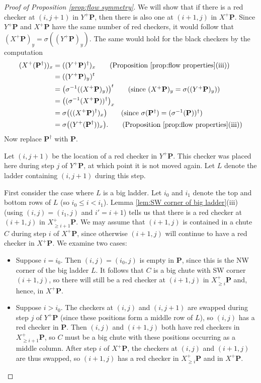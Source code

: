 \documentclass[11pt,reqno]{amsart} %
\newcommand{\bfP}{\mathbf{P}}
\theoremstyle{definition}
\begin{document}
\begin{proof}[Proof of Proposition \ref{prop:flow symmetry}]
We will show that if there is a red checker at $(i,j+1)$ in $Y^+\bfP$, then there is also one at $(i+1,j)$ in $X^+\bfP$.
Since $Y^+\bfP$ and $X^+\bfP$ have the same number of red checkers, it would follow that $(X^+\bfP)_y = \sigma((Y^+\bfP)_y)$.
The same would hold for the black checkers by the computation
\begin{align*}
    (X^+(\bfP^\dagger))_x
    &= ((Y^+\bfP)^\dagger)_x
    \tag{Proposition \ref{prop:flow properties}(iii)} \\
    &= ((Y^+\bfP)_y)^t
    \\
    &= \big(\sigma^{-1}((X^+\bfP)_y)\big)^t
    \tag{since $(X^+\bfP)_y = \sigma((Y^+\bfP)_y)$} \\
    &= \big((\sigma^{-1}(X^+\bfP))^\dagger\big)_x
    \\
    &= \sigma\big(((X^+\bfP)^\dagger)_x\big)
    \tag{since $\sigma(\bfP^\dagger) = (\sigma^{-1}(\bfP))^\dagger$}\\
    &= \sigma\big((Y^+(\bfP^\dagger))_x\big).
    \tag{Proposition \ref{prop:flow properties}(iii)}
\end{align*}
Now replace $\bfP^\dagger$ with $\bfP$.


Let $(i,j+1)$ be the location of a red checker in $Y^+\bfP$.
This checker was placed here during step $j$ of $Y^+\bfP$, at which point it is not moved again.
Let $L$ denote the ladder containing $(i,j+1)$ during this step.

First consider the case where $L$ is a big ladder.
Let $i_0$ and $i_1$ denote the top and bottom rows of $L$ (so $i_0\leq i< i_1$).
Lemma \ref{lem:SW corner of big ladder}(iii) (using $(i,j) = (i_1,j)$ and $i'=i+1$) tells us that there is a red checker at $(i+1,j)$ in $X^+_{\geq i+1}\bfP$.
We may assume that $(i+1,j)$ is contained in a chute $C$ during step $i$ of $X^+\bfP$, since otherwise $(i+1,j)$ will continue to have a red checker in $X^+\bfP$.
We examine two cases:
\begin{itemize}
\item 
Suppose $i=i_0$.
Then $(i,j) = (i_0,j)$ is empty in $\bfP$, since this is the NW corner of the big ladder $L$.
It follows that $C$ is a big chute with SW corner $(i+1,j)$, so there will still be a red checker at $(i+1,j)$ in $X^+_{\geq i}\bfP$ and, hence, in $X^+\bfP$.

\item
Suppose $i> i_0$.
The checkers at $(i,j)$ and $(i,j+1)$ are swapped during step $j$ of $Y^+\bfP$ (since these positions form a middle row of $L$), so $(i,j)$ has a red checker in $\bfP$.
Then $(i,j)$ and $(i+1,j)$ both have red checkers in $X^+_{\geq i+1}\bfP$, so $C$ must be a big chute with these positions occurring as a middle column.
After step $i$ of $X^+\bfP$, the checkers at $(i,j)$ and $(i+1,j)$ are thus swapped, so $(i+1,j)$ has a red checker in $X^+_{\geq i}\bfP$ and in $X^+\bfP$.
\end{itemize}


\end{proof}
\end{document}
